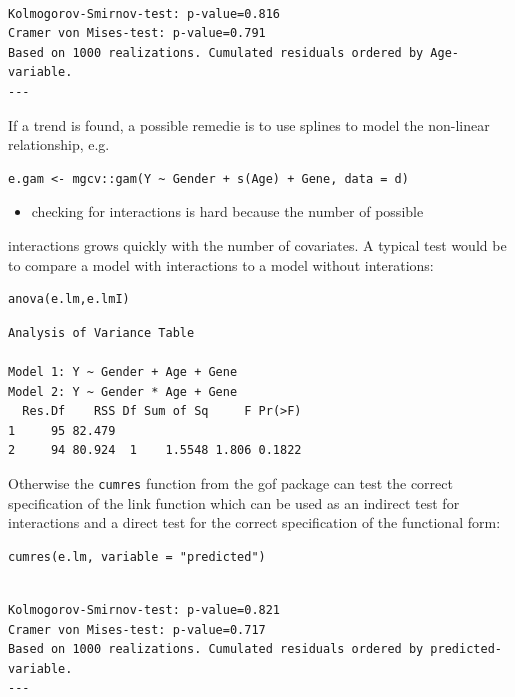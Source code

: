 \documentclass{article}
\begin{document}
\begin{verbatim}

Kolmogorov-Smirnov-test: p-value=0.816
Cramer von Mises-test: p-value=0.791
Based on 1000 realizations. Cumulated residuals ordered by Age-variable.
---
\end{verbatim}

If a trend is found, a possible remedie is to use splines to model the
non-linear relationship, e.g. 
\lstset{language=r,label= ,caption= ,captionpos=b,numbers=none}
\begin{lstlisting}
e.gam <- mgcv::gam(Y ~ Gender + s(Age) + Gene, data = d)
\end{lstlisting}

\begin{itemize}
\item checking for interactions is hard because the number of possible
\end{itemize}
interactions grows quickly with the number of covariates. A typical
test would be to compare a model with interactions to a model without
interations:
\lstset{language=r,label= ,caption= ,captionpos=b,numbers=none}
\begin{lstlisting}
anova(e.lm,e.lmI)
\end{lstlisting}

\begin{verbatim}
Analysis of Variance Table

Model 1: Y ~ Gender + Age + Gene
Model 2: Y ~ Gender * Age + Gene
  Res.Df    RSS Df Sum of Sq     F Pr(>F)
1     95 82.479                          
2     94 80.924  1    1.5548 1.806 0.1822
\end{verbatim}
Otherwise the \texttt{cumres} function from the gof package can test the
correct specification of the link function which can be used as an
indirect test for interactions and a direct test for the correct
specification of the functional form:
\lstset{language=r,label= ,caption= ,captionpos=b,numbers=none}
\begin{lstlisting}
cumres(e.lm, variable = "predicted")
\end{lstlisting}

\begin{verbatim}

Kolmogorov-Smirnov-test: p-value=0.821
Cramer von Mises-test: p-value=0.717
Based on 1000 realizations. Cumulated residuals ordered by predicted-variable.
---
\end{verbatim}
\end{document}
